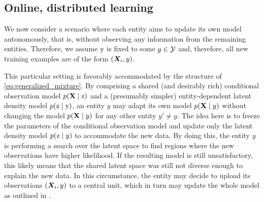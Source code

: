 \subsection{Online, distributed learning}
\label{sec:distributed_learning}

We now consider a scenario where each entity aims to update its own model autonomously, that is, without observing any information from the remaining entities. Therefore, we assume ${\textnormal{y}}$ is fixed to some $y \in {\mathcal{Y}}$ and, therefore, all new training examples are of the form $({\bm{X}}_i, y)$.

This particular setting is favorably accommodated by the structure of \eqref{eq:generalized_mixture}. By comprising a shared (and desirably rich) conditional observation model $p({\mathbf{X}} \mid {\textnormal{z}})$ and a (presumably simpler) entity-dependent latent density model $p({\textnormal{z}} \mid {\textnormal{y}})$, an entity $y$ may adapt its own model $p({\mathbf{X}} \mid y)$ without changing the model $p({\mathbf{X}} \mid y)$ for any other entity $y' \neq y$. The idea here is to freeze the parameters of the conditional observation model and update only the latent density model $p({\textnormal{z}} \mid y)$ to accommodate the new data. By doing this, the entity $y$ is performing a search over the latent space to find regions where the new observations have higher likelihood. If the resulting model is still unsatisfactory, this likely means that the shared latent space was still not diverse enough to explain the new data. In this circumstance, the entity may decide to upload its observations $({\bm{X}}_i, y)$ to a central unit, which in turn may update the whole model as outlined in .
